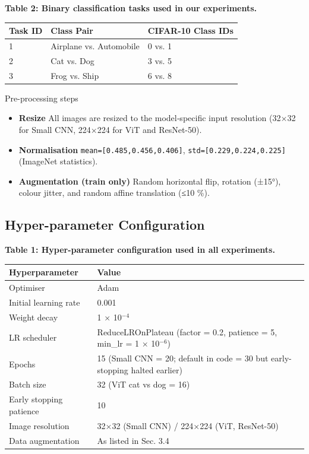 \documentclass[11pt]{article}
\begin{document}
\textbf{Table 2: Binary classification tasks used in our experiments.}

\begin{tabular}{lll}
\hline
Task ID & Class Pair & CIFAR-10 Class IDs \\
\hline
1 & Airplane vs. Automobile & 0 vs. 1 \\
2 & Cat vs. Dog & 3 vs. 5 \\
3 & Frog vs. Ship & 6 vs. 8 \\
\hline
\end{tabular}

Pre-processing steps
\begin{itemize}
\item \textbf{Resize} All images are resized to the model‐specific input resolution (32×32 for Small CNN, 224×224 for ViT and ResNet-50).
\item \textbf{Normalisation} \texttt{mean=[0.485,0.456,0.406]}, \texttt{std=[0.229,0.224,0.225]} (ImageNet statistics).
\item \textbf{Augmentation (train only)} Random horizontal flip, rotation (±15°), colour jitter, and random affine translation (≤10 \%).
\end{itemize}

\subsection{Hyper-parameter Configuration}
\textbf{Table 1: Hyper-parameter configuration used in all experiments.}

\begin{tabular}{ll}
\hline
Hyperparameter & Value \\
\hline
Optimiser & Adam \\
Initial learning rate & 0.001 \\
Weight decay & 1 × 10$^{-4}$ \\
LR scheduler & ReduceLROnPlateau (factor = 0.2, patience = 5, min\_lr = 1 × 10$^{-6}$) \\
Epochs & 15 (Small CNN = 20; default in code = 30 but early-stopping halted earlier) \\
Batch size & 32 (ViT cat vs dog = 16) \\
Early stopping patience & 10 \\
Image resolution & 32×32 (Small CNN) / 224×224 (ViT, ResNet-50) \\
Data augmentation & As listed in Sec. 3.4 \\
\hline
\end{tabular}
\end{document}
